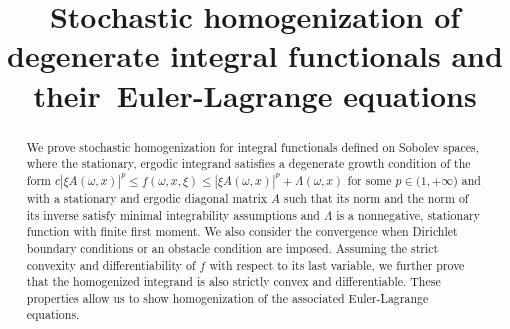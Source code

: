 \documentclass[JEP,XML,SOM,Unicode,published]{cedram}
\theoremstyle{definition}
\begin{document}
\frontmatter

\title[Stochastic homogenization of degenerate integral functionals]{Stochastic homogenization of degenerate integral functionals and their~Euler-Lagrange equations}

\author[\initial{M.} \lastname{Ruf}]{ }
\address{Section de mathématiques, École Polytechnique Fédérale de Lausanne\\ Station 8, 1015 Lausanne, Switzerland}

\author[\initial{Th.} \lastname{Ruf}]{ }
\address{Institut für Mathematik, Universität Augsburg\\
86159 Augsburg, Germany}

\begin{abstract}
We prove stochastic homogenization for integral functionals defined on Sobolev spaces, where the stationary, ergodic integrand satisfies a degenerate growth condition of the form $c|\xi A(\omega,x)|^p\leq f(\omega,x,\xi)\leq |\xi A(\omega,x)|^p+\Lambda(\omega,x)$ for some $p\in (1,+\infty$) and with a stationary and ergodic diagonal matrix $A$ such that its norm and the norm of its inverse satisfy minimal integrability assumptions and $\Lambda$ is a nonnegative, stationary function with finite first moment. We also consider the convergence when Dirichlet boundary conditions or an obstacle condition are imposed. Assuming the strict convexity and differentiability of $f$ with respect to its last variable, we further prove that the homogenized integrand is also strictly convex and differentiable. These properties allow us to show homogenization of the associated Euler-Lagrange equations.
\end{abstract}




\end{document}
